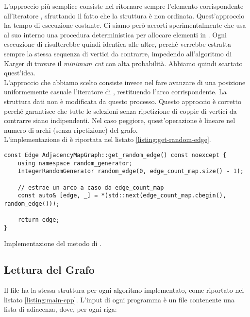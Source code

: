 \noindent L'approccio più semplice consiste nel ritornare sempre l'elemento corrispondente all'iteratore , sfruttando il fatto che la struttura è non ordinata. Quest'approccio ha tempo di esecuzione costante.
Ci siamo però accorti sperimentalmente che  usa al suo interno una procedura deterministica per allocare elementi in . Ogni esecuzione di  risulterebbe quindi identica alle altre, perché verrebbe estratta sempre la stessa sequenza di vertici da contrarre, impedendo all'algoritmo di Karger di trovare il \textit{minimum cut} con alta probabilità. Abbiamo quindi scartato quest'idea. \\

\noindent L'approccio che abbiamo scelto consiste invece nel fare avanzare di una posizione uniformemente casuale l'iteratore di , restituendo l'arco corrispondente. La struttura dati non è modificata da questo processo. Questo approccio è corretto perché garantisce che tutte le selezioni senza ripetizione di coppie di vertici da contrarre siano indipendenti. Nel caso peggiore, quest'operazione è lineare nel numero di archi (senza ripetizione) del grafo. \\

\noindent L'implementazione di  è riportata nel listato \ref{listing:get-random-edge}.

\begin{listing}[!ht]
\begin{verbatim}
const Edge AdjacencyMapGraph::get_random_edge() const noexcept {
    using namespace random_generator;
    IntegerRandomGenerator random_edge(0, edge_count_map.size() - 1);

    // estrae un arco a caso da edge_count_map
    const auto& [edge, _] = *(std::next(edge_count_map.cbegin(), random_edge()));

    return edge;
}
\end{verbatim}
\caption{Implementazione del metodo  di .}
\label{listing:get-random-edge}
\end{listing}

\subsection{Lettura del Grafo}

\noindent Il file  ha la stessa struttura per
ogni algoritmo implementato, come riportato nel listato \ref{listing:main-cpp}.
L'input di ogni programma è un file contenente una lista di
adiacenza, dove, per ogni riga:

